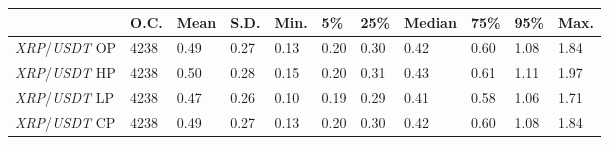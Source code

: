 \begin{tabular}{lllllllllll}
\toprule
 & \textbf{O.C.} & \textbf{Mean} & \textbf{S.D.} & \textbf{Min.} & \textbf{5\%} & \textbf{25\%} & \textbf{Median} & \textbf{75\%} & \textbf{95\%} & \textbf{Max.} \\
\midrule
\emph{XRP}/\emph{USDT} OP & 4238 & 0.49 & 0.27 & 0.13 & 0.20 & 0.30 & 0.42 & 0.60 & 1.08 & 1.84 \\
\emph{XRP}/\emph{USDT} HP & 4238 & 0.50 & 0.28 & 0.15 & 0.20 & 0.31 & 0.43 & 0.61 & 1.11 & 1.97 \\
\emph{XRP}/\emph{USDT} LP & 4238 & 0.47 & 0.26 & 0.10 & 0.19 & 0.29 & 0.41 & 0.58 & 1.06 & 1.71 \\
\emph{XRP}/\emph{USDT} CP & 4238 & 0.49 & 0.27 & 0.13 & 0.20 & 0.30 & 0.42 & 0.60 & 1.08 & 1.84 \\
\bottomrule
\end{tabular}
